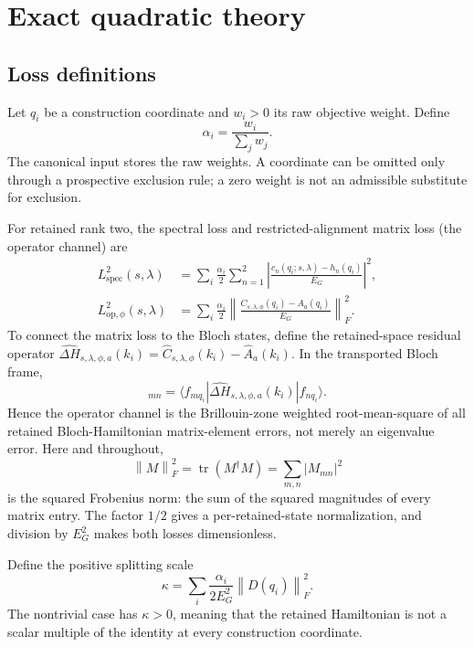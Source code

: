 \documentclass[11pt]{article}
\newcommand{\norm}[1]{\left\lVert #1\right\rVert}
\begin{document}
\section{Exact quadratic theory}

\subsection{Loss definitions}

Let $q_i$ be a construction coordinate and $w_i>0$ its raw objective weight. Define
\[
 \alpha_i=\frac{w_i}{\sum_jw_j}.
\]
The canonical input stores the raw weights. A coordinate can be omitted only through a
prospective exclusion rule; a zero weight is not an admissible substitute for exclusion.

For retained rank two, the spectral loss and restricted-alignment matrix loss
(the operator channel) are
\begin{align}
 L_{\mathrm{spec}}^2(s,\lambda)
 &=\sum_i\frac{\alpha_i}{2}
   \sum_{n=1}^{2}
   \left|
   \frac{c_n(q_i;s,\lambda)-h_n(q_i)}{E_G}
   \right|^2,
 \label{eq:spectral-loss}\\
 L_{\mathrm{op},\phi}^2(s,\lambda)
 &=\sum_i\frac{\alpha_i}{2}
   \left\lVert
   \frac{C_{s,\lambda,\phi}(q_i)-A_a(q_i)}{E_G}
   \right\rVert_F^2.
 \label{eq:operator-loss}
\end{align}
To connect the matrix loss to the Bloch states, define the retained-space residual
operator
$\widehat{\Delta H}_{s,\lambda,\phi,a}(k_i)
 =\widehat C_{s,\lambda,\phi}(k_i)-\widehat A_a(k_i)$. In the transported Bloch frame,
\begin{equation}
 [C_{s,\lambda,\phi}(q_i)-A_a(q_i)]_{mn}
 =\langle f_{mq_i}|\widehat{\Delta H}_{s,\lambda,\phi,a}(k_i)
  |f_{nq_i}\rangle.
 \label{eq:operator-residual-bloch-matrix-element}
\end{equation}
Hence the operator channel is the Brillouin-zone weighted root-mean-square of all
retained Bloch-Hamiltonian matrix-element errors, not merely an eigenvalue error. Here
and throughout,
\begin{equation}
 \norm{M}_F^2=\operatorname{tr}(M^\dagger M)=\sum_{m,n}|M_{mn}|^2
 \label{eq:frobenius-definition}
\end{equation}
is the squared Frobenius norm: the sum of the squared magnitudes of every matrix entry.
The factor $1/2$ gives a per-retained-state normalization, and division by $E_G^2$
makes both losses dimensionless.

Define the positive splitting scale
\begin{equation}
 \kappa=
 \sum_i\frac{\alpha_i}{2E_G^2}\norm{D(q_i)}_F^2.
 \label{eq:kappa}
\end{equation}
The nontrivial case has $\kappa>0$, meaning that the retained Hamiltonian is not a scalar
multiple of the identity at every construction coordinate.
\end{document}
